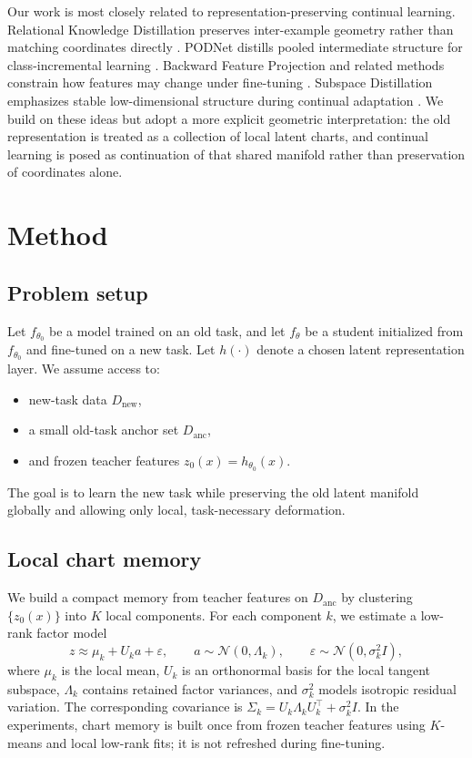 \documentclass[11pt]{article}
\begin{document}
Our work is most closely related to representation-preserving continual learning. Relational Knowledge Distillation preserves inter-example geometry rather than matching coordinates directly \citep{park2019rkd}. PODNet distills pooled intermediate structure for class-incremental learning \citep{douillard2020podnet}. Backward Feature Projection and related methods constrain how features may change under fine-tuning \citep{zheng2023bfp}. Subspace Distillation emphasizes stable low-dimensional structure during continual adaptation \citep{li2023subspace}. We build on these ideas but adopt a more explicit geometric interpretation: the old representation is treated as a collection of local latent charts, and continual learning is posed as continuation of that shared manifold rather than preservation of coordinates alone.

\section{Method}
\subsection{Problem setup}
Let $f_{\theta_0}$ be a model trained on an old task, and let $f_\theta$ be a student initialized from $f_{\theta_0}$ and fine-tuned on a new task. Let $h(\cdot)$ denote a chosen latent representation layer. We assume access to:
\begin{itemize}[leftmargin=1.25em]
  \item new-task data $D_{\text{new}}$,
  \item a small old-task anchor set $D_{\text{anc}}$,
  \item and frozen teacher features $z_0(x)=h_{\theta_0}(x)$.
\end{itemize}
The goal is to learn the new task while preserving the old latent manifold globally and allowing only local, task-necessary deformation.

\subsection{Local chart memory}
We build a compact memory from teacher features on $D_{\text{anc}}$ by clustering $\{z_0(x)\}$ into $K$ local components. For each component $k$, we estimate a low-rank factor model
\[
z \approx \mu_k + U_k a + \varepsilon,
\qquad
a \sim \mathcal{N}(0,\Lambda_k),
\qquad
\varepsilon \sim \mathcal{N}(0,\sigma_k^2 I),
\]
where $\mu_k$ is the local mean, $U_k$ is an orthonormal basis for the local tangent subspace, $\Lambda_k$ contains retained factor variances, and $\sigma_k^2$ models isotropic residual variation. The corresponding covariance is $\Sigma_k = U_k \Lambda_k U_k^\top + \sigma_k^2 I$. In the experiments, chart memory is built once from frozen teacher features using $K$-means and local low-rank fits; it is not refreshed during fine-tuning.
\end{document}
